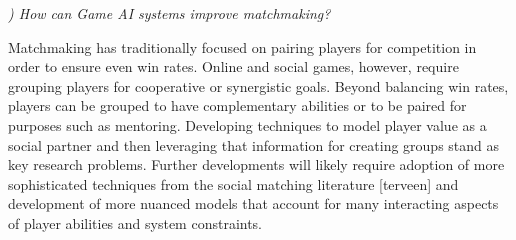 \documentclass[conference]{IEEEtran}
\newcounter{questionno}
\newcommand{\subsubsectionx}[1]{{\em {\arabic{questionno}) #1}}
	\addtocounter{questionno}{1}
	}
\begin{document}

\subsubsectionx{How can Game AI systems improve matchmaking?}
%
Matchmaking has traditionally focused on pairing players for competition in order to ensure even win rates.
Online and social games, however, require grouping players for cooperative or synergistic goals. Beyond balancing win rates, players can be grouped to have complementary abilities or to be paired for purposes such as mentoring. 
Developing techniques to model player value as a social partner and then leveraging that information for creating groups stand as key research problems. Further developments will likely require adoption of more sophisticated techniques from the social matching literature [terveen] and development of more nuanced models that account for many interacting aspects of player abilities and system constraints.
\end{document}
